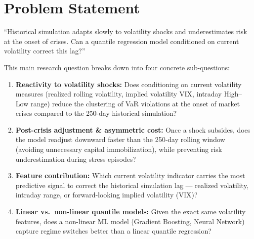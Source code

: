 \documentclass[10pt,a4paper]{article}
\begin{document}
\section{Problem Statement}
\begin{questionbox}
``Historical simulation adapts slowly to volatility shocks and underestimates risk at the onset of crises. Can a quantile regression model conditioned on current volatility correct this lag?''
\end{questionbox}
This main research question breaks down into four concrete sub-questions:
\begin{enumerate}
  \item \textbf{Reactivity to volatility shocks:} Does conditioning on current volatility measures (realized rolling volatility, implied volatility VIX, intraday High--Low range) reduce the clustering of VaR violations at the onset of market crises compared to the 250-day historical simulation?
  \item \textbf{Post-crisis adjustment \& asymmetric cost:} Once a shock subsides, does the model readjust downward faster than the 250-day rolling window (avoiding unnecessary capital immobilization), while preventing risk underestimation during stress episodes?
  \item \textbf{Feature contribution:} Which current volatility indicator carries the most predictive signal to correct the historical simulation lag --- realized volatility, intraday range, or forward-looking implied volatility (VIX)?
  \item \textbf{Linear vs.\ non-linear quantile models:} Given the exact same volatility features, does a non-linear ML model (Gradient Boosting, Neural Network) capture regime switches better than a linear quantile regression?
\end{enumerate}

\end{document}
